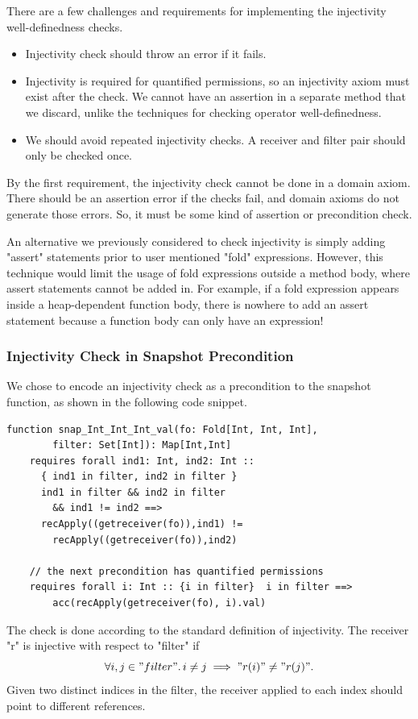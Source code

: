 \documentclass[msc,oneside]{ubcthesis}
\theoremstyle{definition}
\begin{document}
There are a few challenges and requirements for implementing the injectivity well-definedness checks.
\begin{itemize}
    \item Injectivity check should throw an error if it fails.
    \item Injectivity is required for quantified permissions, so an injectivity axiom must exist after the check. We cannot have an assertion in a separate method that we discard, unlike the techniques for checking operator well-definedness.
    \item We should avoid repeated injectivity checks. A receiver and filter pair should only be checked once.
\end{itemize}

By the first requirement, the injectivity check cannot be done in a domain axiom. There should be an assertion error if the checks fail, and domain axioms do not generate those errors. So, it must be some kind of assertion or precondition check. 

An alternative we previously considered to check injectivity is simply adding "assert" statements prior to user mentioned "fold" expressions. However, this technique would limit the usage of fold expressions outside a method body, where assert statements cannot be added in. For example, if a fold expression appears inside a heap-dependent function body, there is nowhere to add an assert statement because a function body can only have an expression! 

\subsubsection{Injectivity Check in Snapshot Precondition}
We chose to encode an injectivity check as a precondition to the snapshot function, as shown in the following code snippet.
\begin{lstlisting}
function snap_Int_Int_Int_val(fo: Fold[Int, Int, Int], 
        filter: Set[Int]): Map[Int,Int]
    requires forall ind1: Int, ind2: Int ::
      { ind1 in filter, ind2 in filter }
      ind1 in filter && ind2 in filter 
        && ind1 != ind2 ==>
      recApply((getreceiver(fo)),ind1) !=
        recApply((getreceiver(fo)),ind2)
        
    // the next precondition has quantified permissions
    requires forall i: Int :: {i in filter}  i in filter ==> 
        acc(recApply(getreceiver(fo), i).val)
\end{lstlisting}
The check is done according to the standard definition of injectivity. The receiver "r" is injective with respect to "filter" if 
$$\forall i, j \in "filter" \ldotp i \neq j \implies "r(i)" \neq  "r(j)". $$
Given two distinct indices in the filter, the receiver applied to each index should point to different references. 
\end{document}
